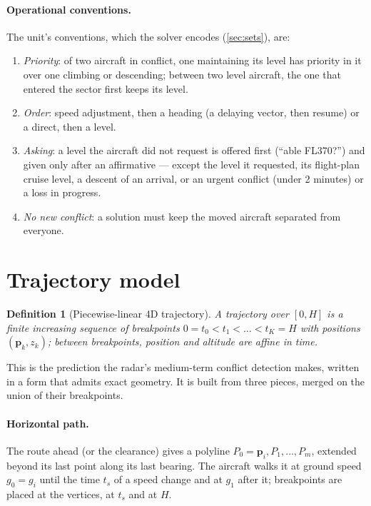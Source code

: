 \documentclass[11pt,a4paper]{article}
\newtheorem{definition}{Definition}
\begin{document}
\paragraph{Operational conventions.} The unit's conventions, which the solver encodes (\cref{sec:sets}), are:
\begin{enumerate}
\item[(P)] \emph{Priority}: of two aircraft in conflict, one maintaining its level has priority in it over one
climbing or descending; between two level aircraft, the one that entered the sector first keeps its level.
\item[(O)] \emph{Order}: speed adjustment, then a heading (a delaying vector, then resume) or a direct, then a level.
\item[(A)] \emph{Asking}: a level the aircraft did not request is offered first (``able FL370?'') and given only
after an affirmative --- except the level it requested, its flight-plan cruise level, a descent of an arrival, or
an urgent conflict (under 2 minutes) or a loss in progress.
\item[(N)] \emph{No new conflict}: a solution must keep the moved aircraft separated from everyone.
\end{enumerate}

\section{Trajectory model}\label{sec:traj}

\begin{definition}[Piecewise-linear 4D trajectory]
A trajectory over $[0,H]$ is a finite increasing sequence of breakpoints $0=t_0<t_1<\dots<t_K=H$ with positions
$(\bm p_k, z_k)$; between breakpoints, position and altitude are affine in time.
\end{definition}

This is the prediction the radar's medium-term conflict detection makes, written in a form that admits exact
geometry. It is built from three pieces, merged on the union of their breakpoints.

\paragraph{Horizontal path.} The route ahead (or the clearance) gives a polyline $P_0=\bm p_i, P_1, \dots, P_m$,
extended beyond its last point along its last bearing. The aircraft walks it at ground speed $g_0 = g_i$ until the
time $t_s$ of a speed change and at $g_1$ after it; breakpoints are placed at the vertices, at $t_s$ and at $H$.
\end{document}
